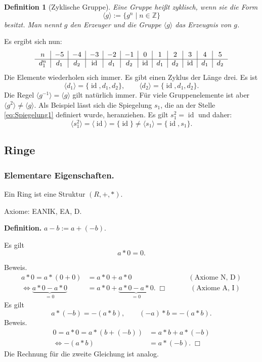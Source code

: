 \documentclass[a4paper,11pt,fleqn,twoside]{scrartcl}
\numberwithin{equation}{section}
\newcommand{\Z}{\mathbb Z}
\newcommand{\id}{\operatorname{id}}
\newcommand{\strong}[1]{{\normalfont\sffamily\bfseries #1}}
\theoremstyle{rmbox}
\newtheorem{Definition}{Definition}
\begin{document}
\begin{Definition}[Zyklische Gruppe]
Eine Gruppe heißt \emph{zyklisch}, wenn sie die Form
\begin{equation}
\langle g\rangle := \{g^n\mid n\in\Z\}
\end{equation}
besitzt. Man nennt $g$ den \emph{Erzeuger}
und die Gruppe $\langle g\rangle$ das \emph{Erzeugnis} von $g$.
\end{Definition}
Es ergibt sich nun:
\begin{equation}
\begin{tabular}{c|c|c|c|c|c|c|c|c|c|c|c}
$n$ & $-5$ & $-4$ & $-3$ & $-2$ & $-1$
& $0$ & $1$ & $2$ & $3$ & $4$ & $5$\\
\hline
$d_1^n$ & $d_1$ & $d_2$ & $\id$ & $d_1$ & $d_2$
& $\id$ & $d_1$ & $d_2$ & $\id$ & $d_1$ & $d_2$
\end{tabular}
\end{equation}
Die Elemente wiederholen sich immer. Es gibt einen Zyklus
der Länge drei. Es ist
\begin{equation}
\langle d_1\rangle = \{\id,d_1,d_2\},\qquad\langle d_2\rangle = \{\id,d_1,d_2\}.
\end{equation}
Die Regel $\langle g^{-1}\rangle = \langle g\rangle$ gilt natürlich
immer. Für viele Gruppenelemente ist aber
$\langle g^2\rangle\ne \langle g\rangle$. Als Beispiel lässt sich die
Spiegelung $s_1$, die an der Stelle \eqref{eq:Spiegelung1} definiert
wurde, heranziehen. Es gilt $s_1^2=\id$ und daher:
\begin{equation}
\langle s_1^2\rangle = \langle\id\rangle
= \{\id\} \ne \langle s_1\rangle = \{\id,s_1\}.
\end{equation}
\subsection{Ringe}
\subsubsection{Elementare Eigenschaften.}
Ein Ring ist eine Struktur $(R,+,*)$.

Axiome: EANIK, EA, D.

\strong{Definition.} $a-b:=a+(-b)$.

Es gilt
\begin{equation}
a*0=0.
\end{equation}

Beweis.
\begin{align}
a*0 = a*(0+0) &= a*0+a*0\qquad\qquad\qquad\qquad (\text{Axiome N, D})\\
\iff \underbrace{a*0-a*0}_{=0} &= a*0+\underbrace{a*0-a*0}_{=0}.\;\Box
\qquad\quad\; (\text{Axiome A, I})
\end{align}
Es gilt
\begin{equation}\label{eq:minus-minus-plus}
a*(-b) = -(a*b),\qquad (-a)*b = -(a*b).
\end{equation}
Beweis.
\begin{align}
0 = a*0 = a*(b+(-b)) &= a*b+a*(-b)\\
\iff  -(a*b) &= a*(-b).\;\Box
\end{align}
Die Rechnung für die zweite Gleichung ist analog.
\end{document}
